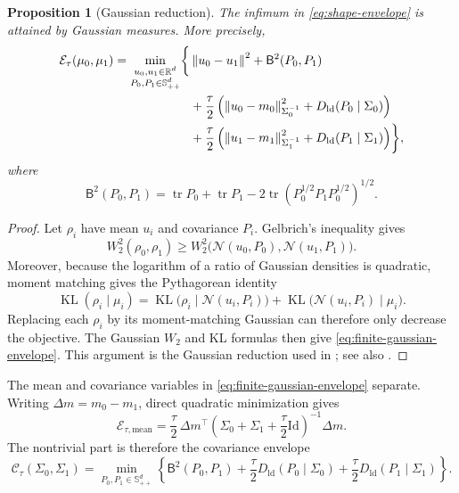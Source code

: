 \documentclass[11pt]{article}
\newtheorem{proposition}[theorem]{Proposition}
\theoremstyle{definition}
\theoremstyle{remark}
\newcommand{\R}{\mathbb R}
\newcommand{\Spp}{\mathbb S_{++}^d}
\newcommand{\Id}{\mathrm{Id}}
\newcommand{\tr}{\operatorname{tr}}
\newcommand{\KL}{\operatorname{KL}}
\newcommand{\BW}{\mathsf B}
\newcommand{\cN}{\mathcal N}
\newcommand{\norm}[1]{\left\lVert #1\right\rVert}
\begin{document}
\begin{proposition}[Gaussian reduction]\label{prop:gaussian-reduction}
The infimum in \eqref{eq:shape-envelope} is attained by Gaussian measures.
More precisely,
\begin{align}
 \mathcal E_\tau(\mu_0,\mu_1)
 =\min_{\substack{u_0,u_1\in\R^d\\P_0,P_1\in\Spp}}
 \biggl\{&
   \norm{u_0-u_1}^2+\BW^2(P_0,P_1)\notag\\
 &+\frac\tau2\left(
   \norm{u_0-m_0}_{\Sigma_0^{-1}}^2
   +D_{\mathrm{ld}}(P_0\mid\Sigma_0)
 \right)\notag\\
 &+\frac\tau2\left(
   \norm{u_1-m_1}_{\Sigma_1^{-1}}^2
   +D_{\mathrm{ld}}(P_1\mid\Sigma_1)
 \right)\biggr\},
 \label{eq:finite-gaussian-envelope}
\end{align}
where
\begin{equation}\label{eq:bures-definition}
 \BW^2(P_0,P_1)
 =\tr P_0+\tr P_1
 -2\tr\!\left(P_0^{1/2}P_1P_0^{1/2}\right)^{1/2}.
\end{equation}
\end{proposition}

\begin{proof}
Let $\rho_i$ have mean $u_i$ and covariance $P_i$. Gelbrich's inequality
gives
\[
 W_2^2(\rho_0,\rho_1)
 \geq W_2^2\bigl(\cN(u_0,P_0),\cN(u_1,P_1)\bigr).
\]
Moreover, because the logarithm of a ratio of Gaussian densities is quadratic,
moment matching gives the Pythagorean identity
\[
 \KL(\rho_i\mid\mu_i)
 =\KL\bigl(\rho_i\mid\cN(u_i,P_i)\bigr)
 +\KL\bigl(\cN(u_i,P_i)\mid\mu_i\bigr).
\]
Replacing each $\rho_i$ by its moment-matching Gaussian can therefore only
decrease the objective. The Gaussian $W_2$ and KL formulas then give
\eqref{eq:finite-gaussian-envelope}. This argument is the Gaussian reduction
used in \citet{YangZhang2026}; see also \citet{Gelbrich1990}.
\end{proof}

The mean and covariance variables in \eqref{eq:finite-gaussian-envelope}
separate. Writing $\Delta m=m_0-m_1$, direct quadratic minimization gives
\begin{equation}\label{eq:mean-envelope-value}
 \mathcal E_{\tau,\mathrm{mean}}
 =\frac\tau2\,
 \Delta m^\top
 \left(\Sigma_0+\Sigma_1+\frac\tau2\Id\right)^{-1}
 \Delta m.
\end{equation}
The nontrivial part is therefore the covariance envelope
\begin{equation}\label{eq:covariance-envelope}
 \mathcal C_\tau(\Sigma_0,\Sigma_1)
 =\min_{P_0,P_1\in\Spp}
 \left\{
   \BW^2(P_0,P_1)
   +\frac\tau2D_{\mathrm{ld}}(P_0\mid\Sigma_0)
   +\frac\tau2D_{\mathrm{ld}}(P_1\mid\Sigma_1)
 \right\}.
\end{equation}
\end{document}
